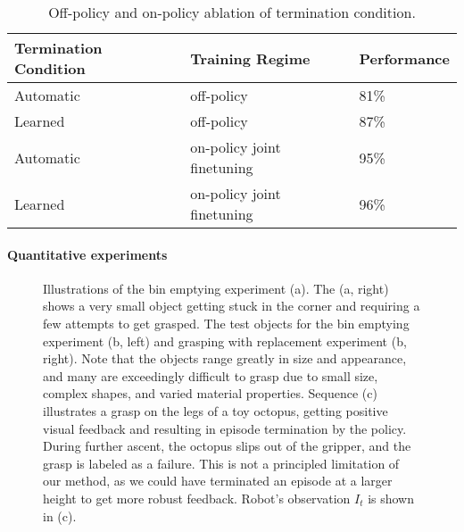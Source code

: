 \documentclass{article}
\begin{document}
\begin{table}[h]
\label{table:termination-ablation}
\begin{center}
\begin{tabular}{|p{12em}|p{9em}|p{7em}|}
\hline
Termination Condition & Training Regime & Performance  \\
\hline
Automatic & off-policy & 81\% \\
\hline
Learned & off-policy & 87\% \\
\hline
Automatic & on-policy joint finetuning & 95\% \\
\hline
Learned & on-policy joint finetuning & 96\% \\
\hline
\end{tabular}
\end{center}
\caption{Off-policy and on-policy ablation of termination condition.}
\vspace{-0.25in}
\end{table}\paragraph{Quantitative experiments}\begin{figure}[h]
    \vspace{-0.05in}
    \centering
    \begin{imgrows}
        \imgrow {}
        \imgrow {}
        \imgrow {}
    \end{imgrows}
    \caption{Illustrations of the bin emptying experiment (a). The (a, right) shows a very small object getting stuck in the corner and requiring a few attempts to get grasped. The test objects for the bin emptying experiment (b, left) and grasping with replacement experiment (b, right). Note that the objects range greatly in size and appearance, and many are exceedingly difficult to grasp due to small size, complex shapes, and varied material properties. Sequence (c) illustrates a grasp on the legs of a toy octopus, %
    getting positive visual feedback and resulting in episode termination by the policy. During further ascent, the octopus slips out of the gripper, and the grasp is labeled as a failure. This is not a principled limitation of our method, as we could have terminated an episode at a larger height to get more robust feedback. Robot's observation $I_t$ is shown in (c).}
    \label{fig:bin_unloading}
    \vspace{-0.2in}
\end{figure}
\end{document}
